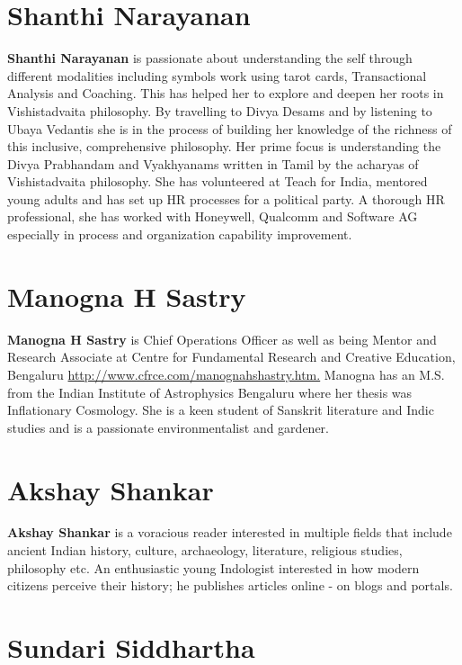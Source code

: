 \section*{Shanthi Narayanan}

\textbf{Shanthi Narayanan} is passionate about understanding the self through different modalities including symbols work using tarot cards, Transactional Analysis and Coaching. This has helped her to explore and deepen her roots in Vishistadvaita philosophy. By travelling to Divya Desams and by listening to Ubaya Vedantis she is in the process of building her knowledge of the richness of this inclusive, comprehensive philosophy. Her prime focus is understanding the Divya Prabhandam and Vyakhyanams written in Tamil by the acharyas of Vishistadvaita philosophy. She has volunteered at Teach for India, mentored young adults and has set up HR processes for a political party. A thorough HR professional, she has worked with Honeywell, Qualcomm and Software AG especially in process and organization capability improvement.

\section*{Manogna H Sastry}

\textbf{Manogna H Sastry} is Chief Operations Officer as well as being Mentor and Research Associate at Centre for Fundamental Research and Creative Education, Bengaluru \url{http://www.cfrce.com/manognahshastry.htm.} Manogna has an M.S. from the Indian Institute of Astrophysics Bengaluru where her thesis was Inflationary Cosmology. She is a keen student of Sanskrit literature and Indic studies and is a passionate environmentalist and gardener.

\section*{Akshay Shankar}

\vskip -2pt

\textbf{Akshay Shankar} is a voracious reader interested in multiple fields that include ancient Indian history, culture, archaeology, literature, religious studies, philosophy etc. An enthusiastic young Indologist interested in how modern citizens perceive their history; he publishes articles online - on blogs and portals.

\section*{Sundari Siddhartha}

